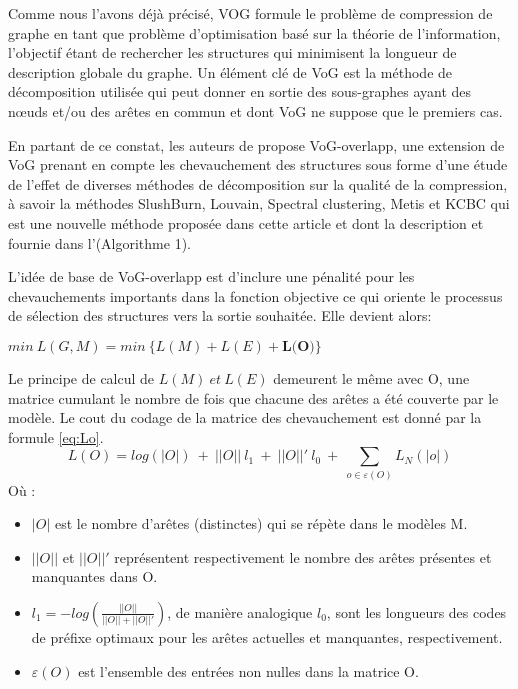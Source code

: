 			Comme nous l'avons déjà précisé, VOG formule le problème de compression de graphe en tant que problème d'optimisation basé sur la théorie de l'information, l'objectif étant de rechercher les structures  qui minimisent la longueur de description globale du graphe. Un élément clé de VoG est la méthode de décomposition utilisée qui peut donner en sortie des sous-graphes ayant des nœuds et/ou des arêtes en commun et dont VoG\citep{koutra2015summarizing} ne suppose que le premiers cas. 
			
			En partant de ce constat, les auteurs de \citep{liu2015empirical} propose VoG-overlapp, une extension de VoG prenant en compte les chevauchement des structures sous forme d'une étude de l'effet de diverses méthodes de décomposition sur la qualité de la compression, à savoir la méthodes SlushBurn, Louvain, Spectral clustering, Metis et KCBC qui est une nouvelle méthode proposée dans cette article et dont la description et fournie dans l'(Algorithme 1).
			
			
			
			L'idée de base de VoG-overlapp est d'inclure une pénalité pour les chevauchements importants dans la fonction objective ce qui oriente le processus de sélection des structures vers la sortie souhaitée. Elle devient alors:
			\begin{center}
				$min\ L(G,M) = min\ \big\{L(M) + L(E) +\textbf{L(O)}\big\}$
			\end{center}
			
			Le principe de calcul de $L(M)\ et\ L(E)$ demeurent le même avec O, une matrice cumulant le nombre de fois que chacune des arêtes a été couverte par le modèle. Le cout du codage de la matrice des chevauchement est donné par la formule \eqref{eq:Lo}.
			\begin{equation} \label{eq:Lo}
				L(O) = log(|O|)\ +\ ||O||\ l_{1}\ +\ ||O||'\ l_{0}\ +\  \displaystyle{\sum_{o\in\varepsilon(O)}L_{N}(|o|)}
			\end{equation}
			Où :
			\begin{itemize}[label=$\circ$]
				\item $|O|$  est le nombre d'arêtes (distinctes) qui se répète dans le modèles M. 
				\item $||O||$ et $||O||'$ représentent respectivement le nombre des arêtes présentes et manquantes dans O.
				\item $l_{1} = -log (\frac{||O||}{||O||+||O||'})$, de manière analogique $l_{0}$, sont les longueurs des codes de préfixe optimaux pour les arêtes actuelles et manquantes, respectivement.
				\item $\varepsilon(O)$  est l'ensemble des entrées non nulles dans la matrice O.\\
			\end{itemize}